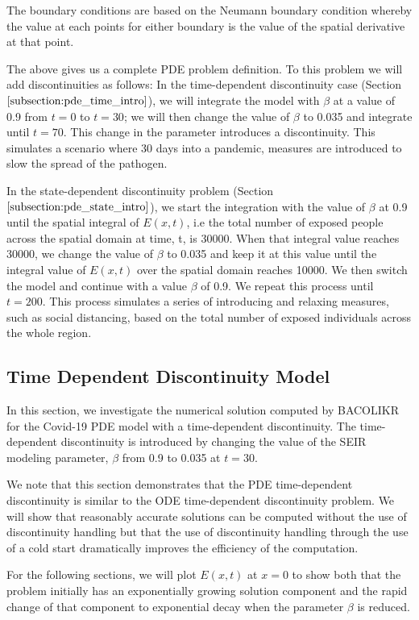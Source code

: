 \documentclass{article}
\begin{document}
The boundary conditions are based on the Neumann boundary condition whereby the value at each points for either boundary is the value of the spatial derivative at that point.

The above gives us a complete PDE problem definition. To this problem we will add discontinuities as follows: 
In the time-dependent discontinuity case (Section $\ref{subsection:pde_time_intro}$), we will integrate the model with $\beta$ at a value of 0.9 from $t=0$ to $t=30$; we will then change the value of $\beta$ to 0.035 and integrate until $t=70$. This change in the parameter introduces a discontinuity. This simulates a scenario where 30 days into a pandemic, measures are introduced to slow the spread of the pathogen.

In the state-dependent discontinuity problem (Section $\ref{subsection:pde_state_intro}$), we start the integration with the value of $\beta$ at 0.9 until the spatial integral of $E(x, t)$, i.e the total number of exposed people across the spatial domain at time, t, is 30000. When that integral value reaches 30000, we change the value of $\beta$ to 0.035 and keep it at this value until the integral value of $E(x, t)$ over the spatial domain reaches 10000. We then switch the model and continue with a value $\beta$ of 0.9. We repeat this process until $t=200$. This process simulates a series of introducing and relaxing measures, such as social distancing, based on the total number of exposed individuals across the whole region.

\subsection{Time Dependent Discontinuity Model}
\label{subsection:pde_time_intro}
In this section, we investigate the numerical solution computed by BACOLIKR for the Covid-19 PDE model with a time-dependent discontinuity. The time-dependent discontinuity is introduced by changing the value of the SEIR modeling parameter, $\beta$ from 0.9 to 0.035 at $t=30$.

We note that this section demonstrates that the PDE time-dependent discontinuity is similar to the ODE time-dependent discontinuity problem. We will show that reasonably accurate solutions can be computed without the use of discontinuity handling but that the use of discontinuity handling through the use of a cold start dramatically improves the efficiency of the computation.

For the following sections, we will plot $E(x, t)$ at $x=0$ to show both that the problem initially has an exponentially growing solution component and the rapid change of that component to exponential decay when the parameter $\beta$ is reduced.
\end{document}
